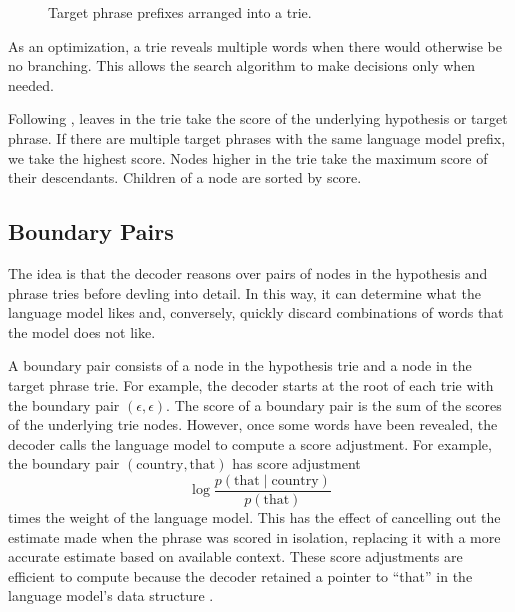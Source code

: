 \documentclass[11pt]{article}
\begin{document}
\begin{figure}\centering
{}
\caption{\label{tgtpre}Target phrase prefixes arranged into a trie.}
\end{figure}

As an optimization, a trie reveals multiple words when there would otherwise be no branching.  This allows the search algorithm to make decisions only when needed.  

Following , leaves in the trie take the score of the underlying hypothesis or target phrase.  If there are multiple target phrases with the same language model prefix, we take the highest score.  Nodes higher in the trie take the maximum score of their descendants.   Children of a node are sorted by score.   

\subsection{Boundary Pairs}
The idea is that the decoder reasons over pairs of nodes in the hypothesis and phrase tries before devling into detail.  In this way, it can determine what the language model likes and, conversely, quickly discard combinations of words that the model does not like.  

A boundary pair consists of a node in the hypothesis trie and a node in the target phrase trie.  For example, the decoder starts at the root of each trie with the boundary pair $(\epsilon, \epsilon)$.  The score of a boundary pair is the sum of the scores of the underlying trie nodes.  However, once some words have been revealed, the decoder calls the language model to compute a score adjustment.  For example, the boundary pair $(\text{country}, \text{that})$ has score adjustment
\[\log \frac{p(\text{that}\mid\text{country})}{p(\text{that})} \]
times the weight of the language model.  This has the effect of cancelling out the estimate made when the phrase was scored in isolation, replacing it with a more accurate estimate based on available context.  These score adjustments are efficient to compute because the decoder retained a pointer to ``that'' in the language model's data structure \cite{iwslt}.  
\end{document}
